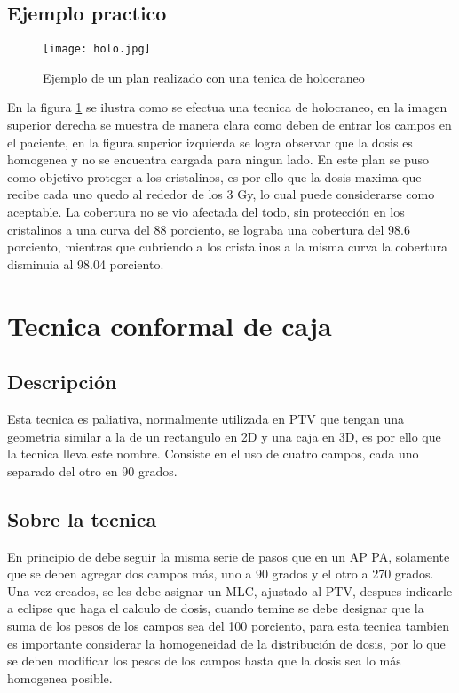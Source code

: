 \documentclass{article}
\begin{document}
\subsection{Ejemplo practico}

\begin{figure}[h!]
    \centering
    \texttt{[image: holo.jpg]}
    \caption{Ejemplo de un plan realizado con una tenica de holocraneo}
    \label{a3}
\end{figure}


En la figura \ref{a3} se ilustra como se efectua una tecnica de holocraneo, en la imagen superior derecha se muestra de manera clara como deben de entrar los campos en el paciente, en la figura superior izquierda se logra observar que la dosis es homogenea y no se encuentra cargada para ningun lado. En este plan se puso como objetivo proteger a los cristalinos, es por ello que la dosis maxima que recibe cada uno quedo al rededor de los 3 Gy, lo cual puede considerarse como aceptable. La cobertura no se vio afectada del todo, sin protección en los cristalinos a una curva del 88 porciento, se lograba una cobertura del 98.6 porciento, mientras que cubriendo a los cristalinos a la misma curva la cobertura disminuia al 98.04 porciento. 


\newpage

\section{Tecnica conformal de caja}

\subsection{Descripción}


Esta tecnica es paliativa, normalmente utilizada en PTV que tengan una geometria similar a la de un rectangulo en 2D y una caja en 3D, es por ello que la tecnica lleva este nombre. Consiste en el uso de cuatro campos, cada uno separado del otro en 90 grados.


\subsection{Sobre la tecnica}


En principio de debe seguir la misma serie de pasos que en un AP PA, solamente que se deben agregar dos campos más, uno a 90 grados y el otro a 270 grados. Una vez creados, se les debe asignar un MLC, ajustado al PTV, despues indicarle a eclipse que haga el calculo de dosis, cuando temine se debe designar que la suma de los pesos de los campos sea del 100 porciento, para esta tecnica tambien es importante considerar la homogeneidad de la distribución de dosis, por lo que se deben modificar los pesos de los campos hasta que la dosis sea lo más homogenea posible.
\end{document}
